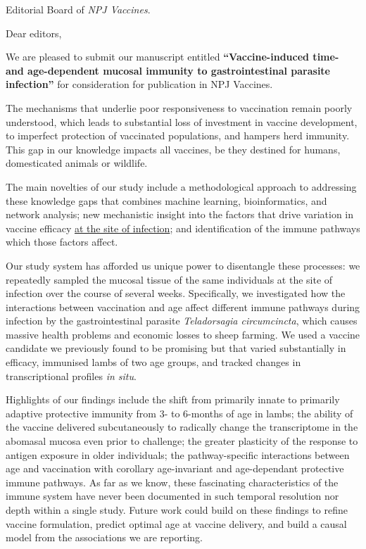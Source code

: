 \documentclass[11pt, a4paper]{letter} %
\begin{document}

\begin{letter}{
    Editorial Board of \emph{NPJ Vaccines}.
}


\opening{Dear editors,}

We are pleased to submit our manuscript entitled \textbf{``Vaccine-induced time- and age-dependent mucosal immunity to gastrointestinal parasite infection''} for consideration for publication in NPJ Vaccines.

The mechanisms that underlie poor responsiveness to vaccination remain poorly understood, which leads to substantial loss of investment in vaccine development, to imperfect protection of vaccinated populations, and hampers herd immunity. This gap in our knowledge impacts all vaccines, be they destined for humans, domesticated animals or wildlife.

The main novelties of our study include a methodological approach to addressing these knowledge gaps that combines machine learning, bioinformatics, and network analysis; new mechanistic insight into the factors that drive variation in vaccine efficacy \ul{at the site of infection}; and identification of the immune pathways which those factors affect.

Our study system has afforded us unique power to disentangle these processes: we repeatedly sampled the mucosal tissue of the same individuals at the site of infection over the course of several weeks. Specifically, we investigated how the interactions between vaccination and age affect different immune pathways during infection by the gastrointestinal parasite \emph{Teladorsagia circumcincta}, which causes massive health problems and economic losses to sheep farming. We used a vaccine candidate we previously found to be promising but that varied substantially in efficacy\footnotemark, immunised lambs of two age groups, and tracked changes in transcriptional profiles \emph{in situ}.

Highlights of our findings include the shift from primarily innate to primarily adaptive protective immunity from 3- to 6-months of age in lambs; the ability of the vaccine delivered subcutaneously to radically change the transcriptome in the abomasal mucosa even prior to challenge; the greater plasticity of the response to antigen exposure in older individuals; the pathway-specific interactions between age and vaccination with corollary age-invariant and age-dependant protective immune pathways. As far as we know, these fascinating characteristics of the immune system have never been documented in such temporal resolution nor depth within a single study. Future work could build on these findings to refine vaccine formulation, predict optimal age at vaccine delivery, and build a causal model from the associations we are reporting.


\end{letter}
\end{document}
